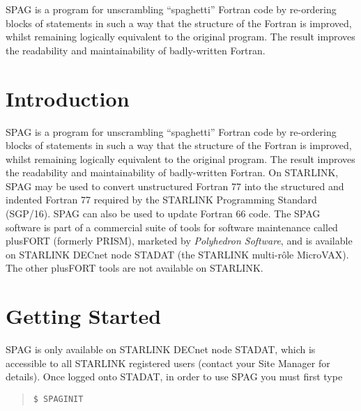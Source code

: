 \documentclass[11pt,twoside]{article}
\newcommand{\stardocinitials}  {SUN}
\newcommand{\stardocnumber}    {63.4}
\newcommand{\stardocabstract}  {
SPAG is a program for unscrambling ``spaghetti'' Fortran code by
re-ordering blocks of statements in such a way that the structure of the
Fortran is improved, whilst remaining logically equivalent to the original
program. 
The result improves the readability and maintainability of badly-written
Fortran.
}
\newcommand{\stardocname}{\stardocinitials /\stardocnumber}
\newenvironment{latexonly}{}{}
\newcommand{\xref}[3]{#1}
\newcommand{\xlabel}[1]{}
\renewcommand{\thepage}{\roman{page}}
\begin{document}
\stardocabstract
\newpage
\begin{latexonly}
   \setlength{\parskip}{0mm}
   \tableofcontents
   \setlength{\parskip}{\medskipamount}
   \markright{\stardocname}
\end{latexonly}
\newpage
\renewcommand{\thepage}{\arabic{page}}
\setcounter{page}{1}

\section {Introduction\xlabel{introduction}}

SPAG is a program for unscrambling ``spaghetti'' Fortran code by
re-ordering blocks of statements in such a way that the structure of the
Fortran is improved, whilst remaining logically equivalent to the original
program. 
The result improves the readability and maintainability of badly-written
Fortran.
On STARLINK, SPAG may be used to convert unstructured Fortran
77 into the structured and indented Fortran 77 required by the
STARLINK Programming Standard
(\xref{SGP/16}{sgp16}{}). 
SPAG can also be used to update Fortran 66 code.
The SPAG software is part of a commercial suite of tools for software
maintenance called plusFORT (formerly PRISM), marketed by {\it Polyhedron
Software}, and is available on STARLINK DECnet node STADAT (the STARLINK
multi-r\^{o}le MicroVAX).
The other plusFORT tools are not available on STARLINK.


\section{Getting Started\xlabel{getting_started}}

SPAG is only available on STARLINK DECnet node STADAT, which is accessible
to all STARLINK registered users (contact your Site Manager for details). 
Once logged onto STADAT, in order to use SPAG you must first type

\begin {quote}
\begin{verbatim}
$ SPAGINIT
\end{verbatim}
\end {quote}
\end{document}

